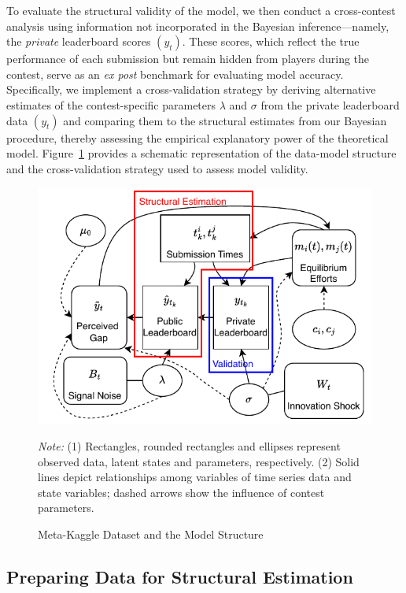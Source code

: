 \documentclass[mnsc]{informs3}
\begin{document}
To evaluate the structural validity of the model, we then conduct a cross-contest analysis using information not incorporated in the Bayesian inference—namely, the \textit{private} leaderboard scores $(y_t)$. 
These scores, which reflect the true performance of each submission but remain hidden from players during the contest, serve as an \textit{ex post} benchmark for evaluating model accuracy.
Specifically, we implement a cross-validation strategy by deriving alternative estimates of the contest-specific parameters $\lambda$ and $\sigma$ from the private leaderboard data $(y_t)$ and comparing them to the structural estimates from our Bayesian procedure, thereby assessing the empirical explanatory power of the theoretical model.
Figure~\ref{kaggledata-diagram} provides a schematic representation of the data-model structure and the cross-validation strategy used to assess model validity.

\begin{figure}[!ht]
	\centering
	\noindent\includegraphics[scale=1.2]{kaggledata_diagram.pdf}
	\caption{Meta-Kaggle Dataset and the Model Structure}
	\label{kaggledata-diagram}
	\begin{minipage}{\textwidth}
{\footnotesize
\medskip
\textit{Note:} (1) Rectangles, rounded rectangles and ellipses represent observed data, latent states and parameters, respectively. 
(2) Solid lines depict relationships among variables of time series data and state variables; dashed arrows show the influence of contest parameters. 
}
\end{minipage}
\end{figure}


\subsection{Preparing Data for Structural Estimation}
\label{sec-data-clean}
\end{document}
